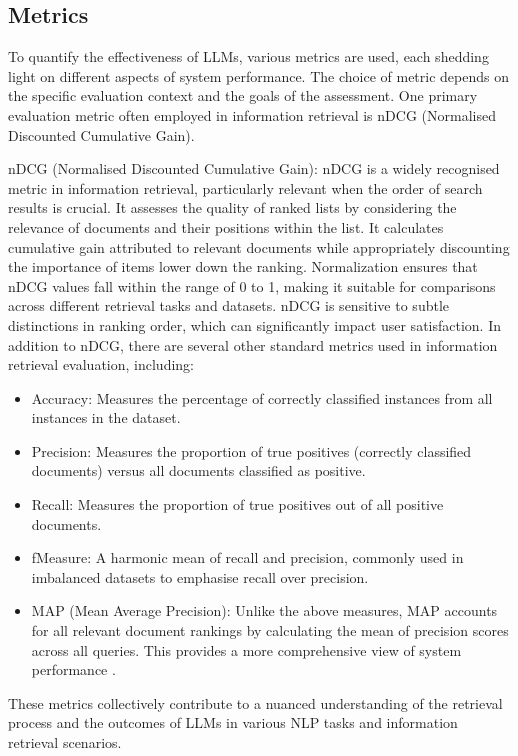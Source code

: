 \subsection{Metrics}
To quantify the effectiveness of LLMs, various metrics are used, each shedding light on different aspects of system performance. The choice of metric depends on the specific evaluation context and the goals of the assessment. One primary evaluation metric often employed in information retrieval is nDCG (Normalised Discounted Cumulative Gain).

nDCG (Normalised Discounted Cumulative Gain): nDCG is a widely recognised metric in information retrieval, particularly relevant when the order of search results is crucial. It assesses the quality of ranked lists by considering the relevance of documents and their positions within the list. It calculates cumulative gain attributed to relevant documents while appropriately discounting the importance of items lower down the ranking. Normalization ensures that nDCG values fall within the range of 0 to 1, making it suitable for comparisons across different retrieval tasks and datasets. nDCG is sensitive to subtle distinctions in ranking order, which can significantly impact user satisfaction.
In addition to nDCG, there are several other standard metrics used in information retrieval evaluation, including:

\begin{itemize}
    \item Accuracy: Measures the percentage of correctly classified instances from all instances in the dataset.
    \item Precision: Measures the proportion of true positives (correctly classified documents) versus all documents classified as positive.
    \item Recall: Measures the proportion of true positives out of all positive documents.
    \item fMeasure: A harmonic mean of recall and precision, commonly used in imbalanced datasets to emphasise recall over precision.
    \item MAP (Mean Average Precision): Unlike the above measures, MAP accounts for all relevant document rankings by calculating the mean of precision scores across all queries. This provides a more comprehensive view of system performance \cite{sokolova}.
\end{itemize}

These metrics collectively contribute to a nuanced understanding of the retrieval process and the outcomes of LLMs in various NLP tasks and information retrieval scenarios.